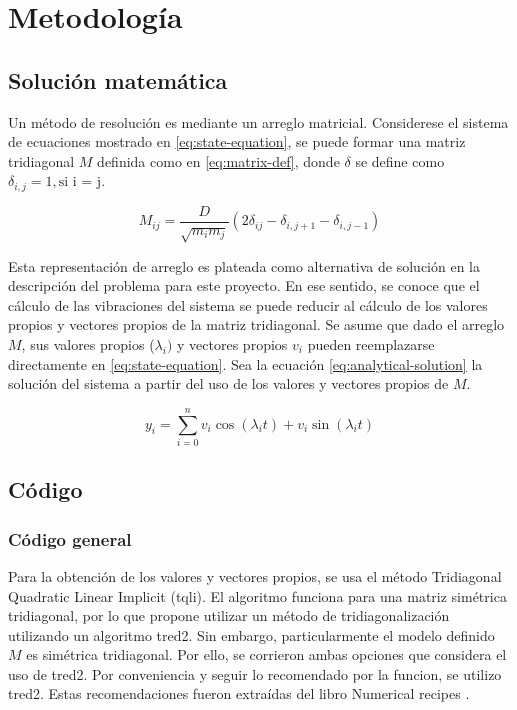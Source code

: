 \section{Metodología}
\subsection{Solución matemática}

Un método de resolución es mediante un arreglo matricial. Considerese el sistema de ecuaciones mostrado en \ref{eq:state-equation}, se puede formar una matriz tridiagonal $M$ definida como en \ref{eq:matrix-def}, donde $\delta$ se define como $\delta_{i,j} = 1, \text{si i = j}$.

\begin{equation}
	M_{ij} = \frac{D}{\sqrt{m_i m_j}} (2 \delta_{ij} - \delta_{i, j+1} - \delta_{i, j-1}) 
	\label{eq:matrix-def}
\end{equation}

Esta representación de arreglo es plateada como alternativa de solución en la descripción del problema para este proyecto. En ese sentido, se conoce que el cálculo de las vibraciones del sistema se puede reducir al cálculo de los valores propios y vectores propios de la matriz tridiagonal. Se asume que dado el arreglo $M$, sus valores propios ($\lambda_i)$ y vectores propios $v_i$ pueden reemplazarse directamente en \ref{eq:state-equation}. Sea la ecuación \ref{eq:analytical-solution} la solución del sistema a partir del uso de los valores y vectores propios de $M$. 

\begin{equation}
	y_{i} = \sum^{n}_{i=0} v_i \cos(\lambda_i t ) + v_i \sin(\lambda_i t )  
	\label{eq:analytical-solution}
\end{equation}

\subsection{Código}
\subsubsection{Código general}

Para la obtención de los valores y vectores propios, se usa el método Tridiagonal Quadratic Linear Implicit (tqli). El algoritmo funciona para una matriz simétrica tridiagonal, por lo que propone utilizar un método de tridiagonalización utilizando un algoritmo tred2. Sin embargo, particularmente el modelo definido $M$ es simétrica tridiagonal. Por ello, se corrieron ambas opciones que considera el uso de tred2. Por conveniencia y seguir lo recomendado por la funcion, se utilizo tred2. Estas recomendaciones fueron extraídas del libro Numerical recipes \cite{press2007numerical}.


